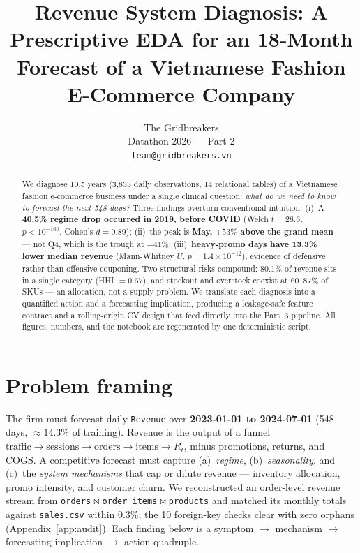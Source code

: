 \documentclass{article}
\title{Revenue System Diagnosis: A Prescriptive EDA for an 18-Month Forecast of a Vietnamese Fashion E-Commerce Company}
\author{%
  The Gridbreakers \\
  Datathon 2026 --- Part 2 \\
  \texttt{team@gridbreakers.vn} \\
}
\begin{document}
\maketitle


\begin{abstract}
We diagnose 10.5 years (3{,}833 daily observations, 14 relational tables) of a Vietnamese fashion e-commerce business under a single clinical question: \emph{what do we need to know to forecast the next 548 days?} Three findings overturn conventional intuition. (i)~A \textbf{40.5\% regime drop occurred in 2019, before COVID} (Welch $t{=}28.6$, $p{<}10^{-160}$, Cohen's $d{=}0.89$); (ii)~the peak is \textbf{May, $+53\%$ above the grand mean} --- not Q4, which is the trough at $-41\%$; (iii)~\textbf{heavy-promo days have 13.3\% lower median revenue} (Mann-Whitney $U$, $p{=}1.4\times10^{-12}$), evidence of defensive rather than offensive couponing. Two structural risks compound: 80.1\% of revenue sits in a single category (HHI $=0.67$), and stockout and overstock coexist at 60--87\% of SKUs --- an allocation, not a supply problem. We translate each diagnosis into a quantified action and a forecasting implication, producing a leakage-safe feature contract and a rolling-origin CV design that feed directly into the Part~3 pipeline. All figures, numbers, and the notebook are regenerated by one deterministic script.
\end{abstract}

\vspace{-6pt}
\section{Problem framing}
\label{sec:framing}
\vspace{-2pt}

The firm must forecast daily \texttt{Revenue} over \textbf{2023-01-01 to 2024-07-01} (548 days, $\approx14.3\%$ of training). Revenue is the output of a funnel $\text{traffic} \to \text{sessions} \to \text{orders} \to \text{items} \to R_t$, minus promotions, returns, and COGS. A competitive forecast must capture (a)~\emph{regime}, (b)~\emph{seasonality}, and (c)~the \emph{system mechanisms} that cap or dilute revenue --- inventory allocation, promo intensity, and customer churn. We reconstructed an order-level revenue stream from \texttt{orders}$\bowtie$\texttt{order\_items}$\bowtie$\texttt{products} and matched its monthly totals against \texttt{sales.csv} within 0.3\%; the 10 foreign-key checks clear with zero orphans (Appendix~\ref{app:audit}). Each finding below is a symptom $\to$ mechanism $\to$ forecasting implication $\to$ action quadruple.
\end{document}
